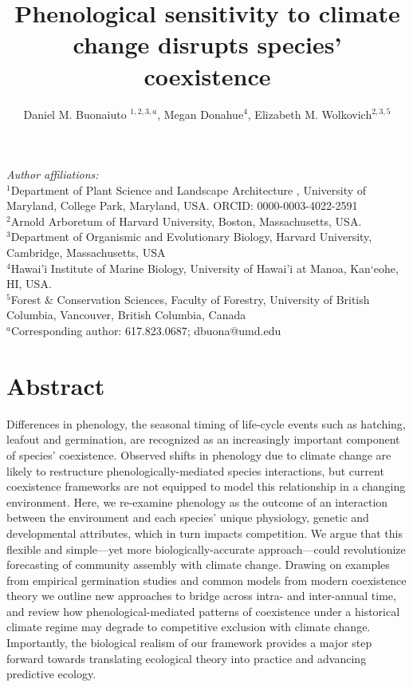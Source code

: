 \documentclass{article}[12pt]
\title{Phenological sensitivity to climate change disrupts species' coexistence}
\author{Daniel M. Buonaiuto $^{1,2,3,a}$, Megan Donahue$^{4}$,  Elizabeth M. Wolkovich$^{2,3,5}$}
\begin{document}

\maketitle
\noindent \emph{Author affiliations:}\\
\noindent $^1$Department of Plant Science and Landscape Architecture , University of Maryland, College Park, Maryland, USA. ORCID: 0000-0003-4022-2591\\
\noindent $^2$Arnold Arboretum of Harvard University, Boston, Massachusetts, USA.\\
$^3$Department of Organismic and Evolutionary Biology, Harvard University, Cambridge, Massachusetts, USA \\
$^4$Hawai'i Institute of Marine Biology, University of Hawai'i at Manoa, Kan‘eohe, HI, USA.\\
$^5$Forest \& Conservation Sciences, Faculty of Forestry, University of British Columbia, Vancouver, British Columbia, Canada\\
$^a$Corresponding author: 617.823.0687; dbuona@umd.edu\\

\section{Abstract} 
Differences in phenology, the seasonal timing of life-cycle events such as hatching, leafout and germination, are recognized as an increasingly important component of species' coexistence. Observed shifts in phenology due to climate change are likely to restructure phenologically-mediated species interactions, but current coexistence frameworks are not equipped to model this relationship in a changing environment. Here, we re-examine phenology as the outcome of an interaction between the environment and each species' unique physiology, genetic and developmental attributes, which in turn impacts competition. We argue that this flexible and simple---yet more biologically-accurate approach---could revolutionize forecasting of community assembly with climate change. Drawing on examples from empirical germination studies and common models from modern coexistence theory we outline new approaches to bridge across intra- and inter-annual time, and review how phenological-mediated patterns of coexistence under a historical climate regime may degrade to competitive exclusion with climate change. %
Importantly, the biological realism of our framework provides a major step forward towards translating ecological theory into practice and advancing predictive ecology. %
\end{document}
